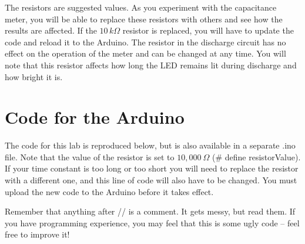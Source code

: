 \documentclass[]{article}
\begin{document}
The resistors are suggested values.  As you experiment with the capacitance meter, you will be able to replace these resistors with others and see how the results are affected.  If the $10\,k \Omega$ resistor is replaced, you will have to update the code and reload it to the Arduino.  The resistor in the discharge circuit has no effect on the operation of the meter and can be changed at any time.  You will note that this resistor affects how long the LED remains lit during discharge and how bright it is.

\section{Code for the Arduino}

The code for this  lab is reproduced below, but is also available in a separate .ino file.  Note that the value of the  resistor is set to $10,000\ \Omega$  (\# define resistorValue).  If your time constant is too long or too short you will need to replace the resistor with a different one, and this line of code will also have to be changed.  You must upload the new code to the Arduino before it takes effect.

Remember that anything after // is a comment.  It gets messy, but read them.  If you have programming experience, you may feel that this is some ugly code -- feel free to improve it!
\end{document}
